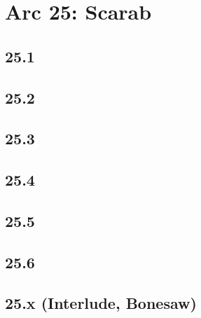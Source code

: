 \part*{Arc 25: Scarab}
 \chapter*{25.1}
 \chapter*{25.2}
 \chapter*{25.3}
 \chapter*{25.4}
 \chapter*{25.5}
 \chapter*{25.6}
 \chapter*{25.x (Interlude, Bonesaw)}








